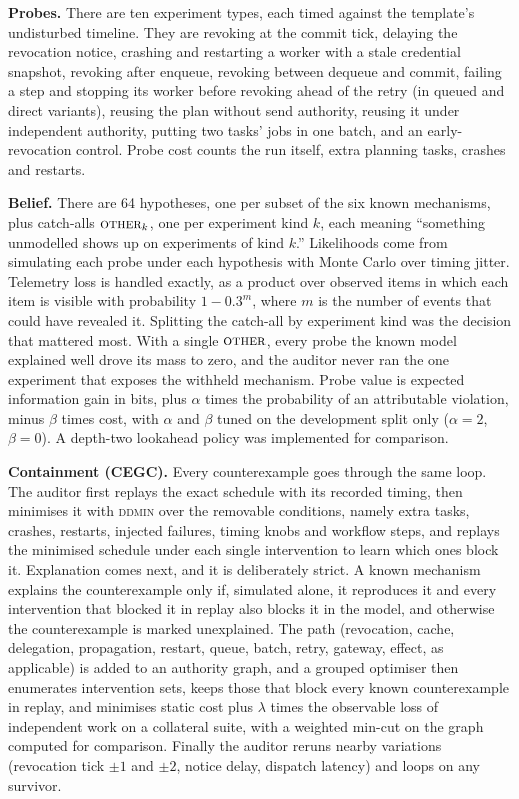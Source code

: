 \documentclass[10pt]{article}
\begin{document}
\textbf{Probes.} There are ten experiment types, each timed against the template's undisturbed timeline. They are revoking at the commit tick, delaying the revocation notice, crashing and restarting a worker with a stale credential snapshot, revoking after enqueue, revoking between dequeue and commit, failing a step and stopping its worker before revoking ahead of the retry (in queued and direct variants), reusing the plan without send authority, reusing it under independent authority, putting two tasks' jobs in one batch, and an early-revocation control. Probe cost counts the run itself, extra planning tasks, crashes and restarts.

\textbf{Belief.} There are 64 hypotheses, one per subset of the six known mechanisms, plus catch-alls $\textsc{other}_k$, one per experiment kind $k$, each meaning ``something unmodelled shows up on experiments of kind $k$.'' Likelihoods come from simulating each probe under each hypothesis with Monte Carlo over timing jitter. Telemetry loss is handled exactly, as a product over observed items in which each item is visible with probability $1-0.3^{m}$, where $m$ is the number of events that could have revealed it. Splitting the catch-all by experiment kind was the decision that mattered most. With a single $\textsc{other}$, every probe the known model explained well drove its mass to zero, and the auditor never ran the one experiment that exposes the withheld mechanism. Probe value is expected information gain in bits, plus $\alpha$ times the probability of an attributable violation, minus $\beta$ times cost, with $\alpha$ and $\beta$ tuned on the development split only ($\alpha=2$, $\beta=0$). A depth-two lookahead policy was implemented for comparison.

\textbf{Containment (CEGC).} Every counterexample goes through the same loop. The auditor first replays the exact schedule with its recorded timing, then minimises it with \textsc{ddmin} over the removable conditions, namely extra tasks, crashes, restarts, injected failures, timing knobs and workflow steps, and replays the minimised schedule under each single intervention to learn which ones block it. Explanation comes next, and it is deliberately strict. A known mechanism explains the counterexample only if, simulated alone, it reproduces it and every intervention that blocked it in replay also blocks it in the model, and otherwise the counterexample is marked unexplained. The path (revocation, cache, delegation, propagation, restart, queue, batch, retry, gateway, effect, as applicable) is added to an authority graph, and a grouped optimiser then enumerates intervention sets, keeps those that block every known counterexample in replay, and minimises static cost plus $\lambda$ times the observable loss of independent work on a collateral suite, with a weighted min-cut on the graph computed for comparison. Finally the auditor reruns nearby variations (revocation tick $\pm1$ and $\pm2$, notice delay, dispatch latency) and loops on any survivor.
\end{document}
